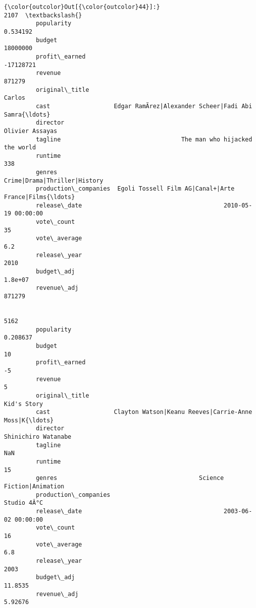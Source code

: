 \documentclass[11pt]{article}
\begin{document}
\begin{Verbatim}[commandchars=\\\{\}]
{\color{outcolor}Out[{\color{outcolor}44}]:}                                                                    2107  \textbackslash{}
         popularity                                                     0.534192   
         budget                                                         18000000   
         profit\_earned                                                 -17128721   
         revenue                                                          871279   
         original\_title                                                   Carlos   
         cast                  Edgar RamÃ­rez|Alexander Scheer|Fadi Abi Samra{\ldots}   
         director                                                Olivier Assayas   
         tagline                                  The man who hijacked the world   
         runtime                                                             338   
         genres                                     Crime|Drama|Thriller|History   
         production\_companies  Egoli Tossell Film AG|Canal+|Arte France|Films{\ldots}   
         release\_date                                        2010-05-19 00:00:00   
         vote\_count                                                           35   
         vote\_average                                                        6.2   
         release\_year                                                       2010   
         budget\_adj                                                      1.8e+07   
         revenue\_adj                                                      871279   
         
                                                                            5162  
         popularity                                                     0.208637  
         budget                                                               10  
         profit\_earned                                                        -5  
         revenue                                                               5  
         original\_title                                              Kid's Story  
         cast                  Clayton Watson|Keanu Reeves|Carrie-Anne Moss|K{\ldots}  
         director                                            Shinichiro Watanabe  
         tagline                                                             NaN  
         runtime                                                              15  
         genres                                        Science Fiction|Animation  
         production\_companies                                        Studio 4Â°C  
         release\_date                                        2003-06-02 00:00:00  
         vote\_count                                                           16  
         vote\_average                                                        6.8  
         release\_year                                                       2003  
         budget\_adj                                                      11.8535  
         revenue\_adj                                                     5.92676  
\end{Verbatim}
            
\end{document}
